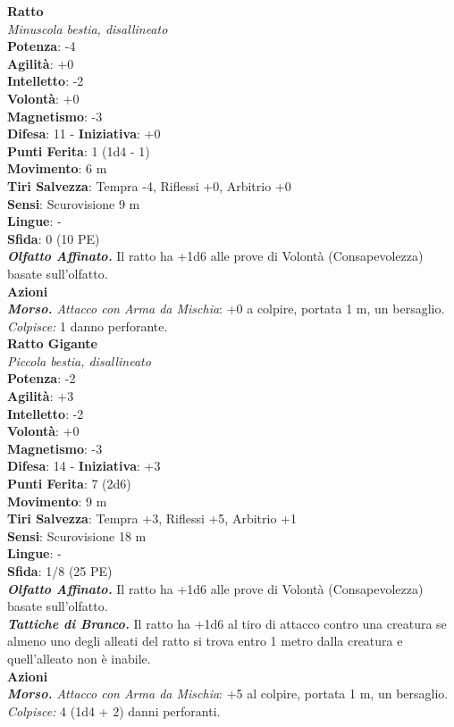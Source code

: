 \begin{multicols}{2}
\medskip\textbf{Ratto}\\
\emph{Minuscola bestia, disallineato}\\
\textbf{Potenza}: -4\\
\textbf{Agilità}: +0\\
\textbf{Intelletto}: -2\\
\textbf{Volontà}: +0\\
\textbf{Magnetismo}: -3\\
\textbf{Difesa}: 11 - \textbf{Iniziativa}: +0\\
\textbf{Punti Ferita}: 1 (1d4 - 1)\\
\textbf{Movimento}: 6 m\\
\textbf{Tiri Salvezza}: Tempra -4, Riflessi +0, Arbitrio +0 \\
\textbf{Sensi}: Scurovisione 9 m\\
\textbf{Lingue}: -\\
\textbf{Sfida}: 0 (10 PE)\smallskip\\
\emph{\textbf{Olfatto Affinato.}} Il ratto ha +1d6 alle prove di Volontà (Consapevolezza) basate sull'olfatto.\\
\smallskip\textbf{Azioni}\\
\emph{\textbf{Morso.} Attacco con Arma da Mischia}: +0 a colpire, portata 1 m, un bersaglio.\\
\emph{Colpisce:} 1 danno perforante.\\

\medskip\textbf{Ratto Gigante}\\
\emph{Piccola bestia, disallineato}\\
\textbf{Potenza}: -2\\
\textbf{Agilità}: +3\\
\textbf{Intelletto}: -2\\
\textbf{Volontà}: +0\\
\textbf{Magnetismo}: -3\\
\textbf{Difesa}: 14 - \textbf{Iniziativa}: +3\\
\textbf{Punti Ferita}: 7 (2d6)\\
\textbf{Movimento}: 9 m\\
\textbf{Tiri Salvezza}: Tempra +3, Riflessi +5, Arbitrio +1 \\
\textbf{Sensi}: Scurovisione 18 m\\
\textbf{Lingue}: -\\
\textbf{Sfida}: 1/8 (25 PE)\smallskip\\
\emph{\textbf{Olfatto Affinato.}} Il ratto ha +1d6 alle prove di Volontà (Consapevolezza) basate sull'olfatto.\\
\emph{\textbf{Tattiche di Branco.}} Il ratto ha +1d6 al tiro di attacco contro una creatura se almeno uno degli alleati del ratto si trova entro 1 metro dalla creatura e quell'alleato non è inabile. \\
\smallskip\textbf{Azioni}\\
\emph{\textbf{Morso.} Attacco con Arma da Mischia}: +5 al colpire, portata 1 m, un bersaglio.\\
\emph{Colpisce:} 4 (1d4 + 2) danni perforanti.\\


\end{multicols}

